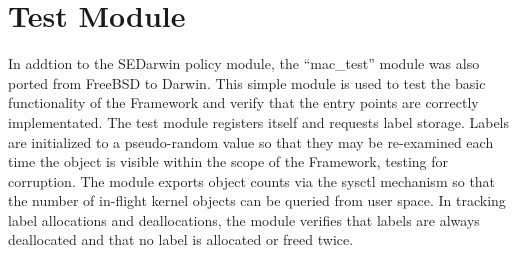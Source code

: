 \section{Test Module}

In addtion to the SEDarwin policy module, the ``mac\_test'' module
was also ported from FreeBSD to Darwin.  This simple module is used
to test the basic functionality of the Framework and verify that
the entry points are correctly implementated.  The test module
registers itself and requests label storage.  Labels are initialized
to a pseudo-random value so that they may be re-examined each time
the object is visible within the scope of the Framework, testing
for corruption.  The module exports object counts via the sysctl
mechanism so that the number of in-flight kernel objects can be
queried from user space.  In tracking label allocations and
deallocations, the module verifies that labels are always deallocated
and that no label is allocated or freed twice.
